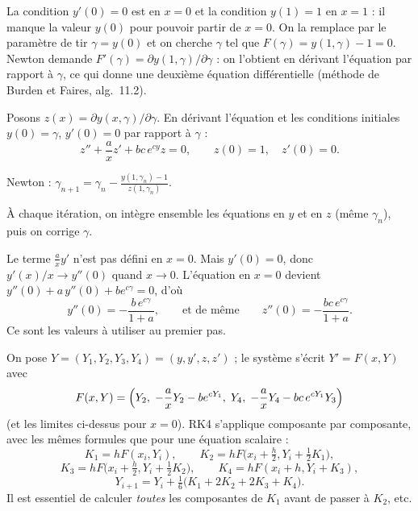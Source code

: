 \Pourquoi La condition $y'(0) = 0$ est en $x = 0$ et la condition $y(1) = 1$
en $x = 1$ : il manque la valeur $y(0)$ pour pouvoir partir de $x = 0$. On la
remplace par le paramètre de tir $\gamma = y(0)$ et on cherche $\gamma$ tel
que $F(\gamma) = y(1, \gamma) - 1 = 0$. Newton demande
$F'(\gamma) = \partial y(1,\gamma)/\partial\gamma$ : on l'obtient en dérivant
l'équation par rapport à $\gamma$, ce qui donne une deuxième équation
différentielle (méthode de Burden et Faires, alg.~11.2).

 Posons $z(x) = \partial y(x,\gamma)/\partial\gamma$. En dérivant
l'équation et les conditions initiales $y(0) = \gamma$, $y'(0) = 0$ par
rapport à $\gamma$ :
\[
  z'' + \frac ax z' + bc\,e^{cy}z = 0, \qquad z(0) = 1, \quad z'(0) = 0 .
\]

 Newton : $\displaystyle \gamma_{n+1} = \gamma_n - \frac{y(1, \gamma_n) - 1}{z(1, \gamma_n)}$.

 À chaque itération, on intègre ensemble les équations en $y$ et en
$z$ (même $\gamma_n$), puis on corrige $\gamma$.

Le terme $\frac ax y'$ n'est pas défini en $x = 0$. Mais $y'(0) = 0$, donc
$y'(x)/x \to y''(0)$ quand $x \to 0$. L'équation en $x = 0$ devient
$y''(0) + a\,y''(0) + be^{c\gamma} = 0$, d'où
\[
  y''(0) = -\frac{b\,e^{c\gamma}}{1 + a}, \qquad\text{et de même}\qquad
  z''(0) = -\frac{bc\,e^{c\gamma}}{1 + a}.
\]
Ce sont les valeurs à utiliser au premier pas.

On pose $Y = (Y_1, Y_2, Y_3, Y_4) = (y, y', z, z')$ ; le système s'écrit
$Y' = F(x, Y)$ avec
\[
  F(x, Y) = \Bigl(Y_2,\; -\frac ax Y_2 - be^{cY_1},\; Y_4,\;
  -\frac ax Y_4 - bc\,e^{cY_1}Y_3\Bigr)
\]
(et les limites ci-dessus pour $x = 0$). RK4 s'applique composante par
composante, avec les mêmes formules que pour une équation scalaire :
\[
  K_1 = hF(x_i, Y_i), \qquad K_2 = hF\bigl(x_i + \tfrac h2, Y_i + \tfrac12K_1\bigr),
\]
\[
  K_3 = hF\bigl(x_i + \tfrac h2, Y_i + \tfrac12K_2\bigr), \qquad
  K_4 = hF(x_i + h, Y_i + K_3),
\]
\[
  Y_{i+1} = Y_i + \tfrac16\bigl(K_1 + 2K_2 + 2K_3 + K_4\bigr).
\]
Il est essentiel de calculer \emph{toutes} les composantes de $K_1$ avant de
passer à $K_2$, etc.

